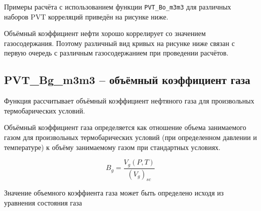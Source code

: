 \documentclass[]{scrreprt}
\begin{document}

Примеры расчёта с использованием функции \texttt{PVT_Bo_m3m3} для различных наборов PVT корреляций приведён на рисунке ниже.

Объёмный коэффициент нефти хорошо коррелирует со значением газосодержания. Поэтому различный вид кривых на рисунке ниже связан с первую очередь с различным газосодержанием при проведении расчётов.

\newcommand{\BoDataFile}{data/Bo_P_data.txt}

\subsection{PVT\_Bg\_m3m3 – объёмный коэффициент газа}
Функция рассчитывает объёмный коэффициент нефтяного газа для произвольных термобарических условий. 

Объёмный коэффициент газа определяется как отношение объема занимаемого газом для произвольных термобарических условий (при определенном давлении и температуре) к объёму занимаемому газом при стандартных условиях. 

$$B_g = \frac{V_g(P,T)}{(V_g)_{sc}}$$

Значение объемного коэффиента газа может быть определено исходя из уравнения состояния газа
\end{document}

